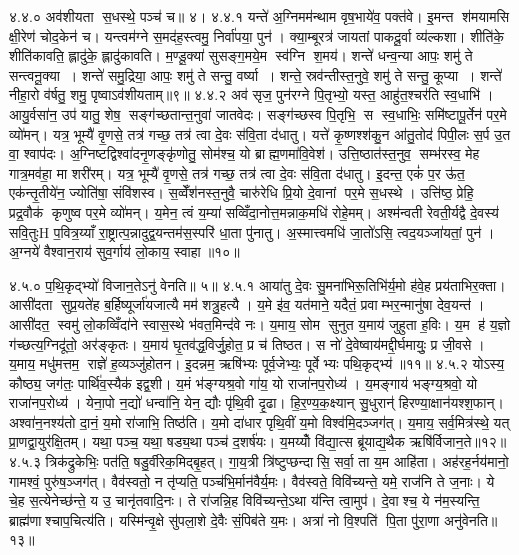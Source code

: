 ४.४.०
अव॑शीयता स॒धस्थे॒ पञ्च॑ च॥ ४।
४.४.१
यन्ते॑ अ॒ग्निमम॑न्थाम वृष॒भाये॑व॒ पक्त॑वे। इ॒मन्त श॑मयामसि क्षी॒रेण॑ चोद॒केन॑ च। यन्त्वम॑ग्ने स॒मद॑ह॒स्त्वमु॒ निर्वा॑पया॒ पुन॑। क्या॒म्बूरत्र॑ जायतां पाकदू॒र्वा व्य॑ल्कशा। शीति॑के॒ शीति॑कावति॒ ह्लादु॑के॒ ह्लादु॑कावति। म॒ण्डू॒क्या॑ सुसङ्ग॒मये॒म स्व॑ग्नि श॒मय॑। शन्ते॑ धन्व॒न्या आपः॒ शमु॑ ते सन्त्वनू॒क्या। शन्ते॑ समु॒द्रिया॒ आपः॒ शमु॑ ते सन्तु॒ वर्ष्या। शन्ते॒ स्रव॑न्तीस्त॒नुवे॒ शमु॑ ते सन्तु॒ कूप्या। शन्ते॑ नीहा॒रो व॑र्\mbox{}षतु॒ शमु॒ पृष्वाऽव॑शीयताम्॥९॥
४.४.२
अव॑ सृज॒ पुन॑रग्ने पि॒तृभ्यो॒ यस्त॒ आहु॑त॒श्चर॑ति स्व॒धाभि॑। आयु॒र्वसा॑न॒ उप॑ यातु॒ शेष॒ सङ्ग॑च्छतान्त॒नुवा॑ जातवेदः। सङ्ग॑च्छस्व पि॒तृभि॒ स स्व॒धाभिः॒ समि॑ष्टापू॒र्तेन॑ पर॒मे व्यो॑मन्। यत्र॒ भूम्यै॑ वृ॒णसे॒ तत्र॑ गच्छ॒ तत्र॑ त्वा दे॒वः स॑वि॒ता द॑धातु। यत्ते॑ कृ॒ष्णश्श॑कु॒न आ॑तु॒तोद॑ पिपी॒लः स॒र्प उ॒त वा॒ श्वाप॑दः। अ॒ग्निष्टद्विश्वा॑दनृ॒णङ्कृ॑णोतु॒ सोम॑श्च॒ यो ब्राह्म॒णमा॑वि॒वेश॑। उत्ति॒ष्ठात॑स्त॒नुव॒ सम्भ॑रस्व॒ मेह गात्र॒मव॑हा॒ मा शरी॑रम्। यत्र॒ भूम्यै॑ वृ॒णसे॒ तत्र॑ गच्छ॒ तत्र॑ त्वा दे॒वः स॑वि॒ता द॑धातु। इ॒दन्त॒ एकं॑ प॒र ऊ॑त॒ एक॑न्तृ॒तीये॑न॒ ज्योति॑षा॒ संवि॑शस्व। स॒व्वेँश॑नस्त॒नुवै॒ चारु॑रेधि प्रि॒यो दे॒वानां पर॒मे स॒धस्थे। उत्ति॑ष्ठ॒ प्रेहि॒ प्रद्र॒वौक॑ कृणुष्व पर॒मे व्यो॑मन्। य॒मेन॒ त्वं य॒म्या॑ सव्विँदा॒नोत्त॒मन्नाक॒मधि॑ रोहे॒मम्। अश्म॑न्वती रेवती॒र्यद्वै दे॒वस्य॑ सवि॒तुःH प॒वित्र॒य्याँ रा॒ष्ट्रात्प॒न्नादुद्व॒यन्तम॑स॒स्परि॑ धा॒ता पु॑नातु। अ॒स्मात्त्वमधि॑ जा॒तो॑ऽसि॒ त्वद॒यञ्जा॑यतां॒ पुन॑। अ॒ग्नये॑ वैश्वान॒राय॑ सुव॒र्गाय॑ लो॒काय॒ स्वाहा॥१०॥
\anuvakamend

४.५.०
प॒थि॒कृद्भ्यो॑ विजान॒तेऽनु॑ वेनति॥ ५॥
४.५.१
आया॑तु दे॒वः सु॒मना॑भिरू॒तिभि॑र्य॒मो ह॑वे॒ह प्रय॑ताभिर॒क्ता। आसी॑दता सुप्र॒यते॑ह ब॒र्\mbox{}हिष्यूर्जा॑यजात्यै मम॑ शत्रु॒हत्यै। य॒मे इ॑व॒ यत॑माने॒ यदैतं॒ प्रवाम्भर॒न्मानु॑षा देव॒यन्त॑। आसी॑दत॒ स्वमु॑ लो॒कव्विँदा॑ने स्वास॒स्थे भ॑वत॒मिन्द॑वे नः। य॒माय॒ सोम सुनुत य॒माय॑ जुहुता ह॒विः। य॒म ह॑ य॒ज्ञो ग॑च्छत्य॒ग्निदू॑तो॒ अर॑ङ्कृतः। य॒माय॑ घृ॒तव॑द्ध॒विर्जु॒होत॒ प्र च॑ तिष्ठत। स नो॑ दे॒वेष्वाय॑मद्दी॒र्घमायुः॒ प्र जी॒वसे। य॒माय॒ मधु॑मत्तम॒ राज्ञे॑ ह॒व्यञ्जु॑होतन। इ॒दन्नम॒ ऋषि॑भ्यः पूर्व॒जेभ्यः॒ पूर्वेभ्यः पथि॒कृद्भ्य॑॥११॥
४.५.२
योऽस्य॒ कौष्ठ्य॒ जग॑तः॒ पार्थि॑व॒स्यैक॑ इद्व॒शी। य॒मं भ॑ङ्ग्यश्र॒वो गा॑य॒ यो राजा॑नप॒रोध्य॑। य॒मङ्गाय॑ भङ्ग्य॒श्रवो॒ यो राजा॑नप॒रोध्य॑। येना॒पो न॒द्यो॑ धन्वा॑नि॒ येन॒ द्यौः पृ॑थि॒वी दृ॒ढा। हि॒र॒ण्य॒क॒क्ष्यान् सु॒धुरान्॑ हिरण्या॒क्षान॑यश्श॒फान्। अश्वा॑न॒नश्य॑तो दा॒नं॒ य॒मो रा॑जाभि॒ तिष्ठ॑ति। य॒मो दा॑धार पृथि॒वीं य॒मो विश्व॑मि॒दञ्जग॑त्। य॒माय॒ सर्व॒मित्र॑स्थे॒ यत् प्रा॒णद्वा॒युर॑क्षि॒तम्। यथा॒ पञ्च॒ यथा॒ षड्य॒था पञ्च॑ द॒शर्\mbox{}ष॑यः। य॒मय्योँ वि॑द्या॒त्स ब्रू॑याद्य॒थैक ऋषि॑र्विजान॒ते॥१२॥
४.५.३
त्रिक॑द्रुकेभिः॒ पत॑ति॒ षडु॒र्वीरेक॒मिद्बृ॒हत्। गा॒य॒त्री त्रि॑ष्टुप्छन्दासि॒ सर्वा॒ ता य॒म आहि॑ता। अह॑रह॒र्नय॑मानो॒ गामश्वं॒ पुरु॑ष॒ञ्जग॑त्। वैव॑स्वतो॒ न तृ॑प्यति॒ पञ्च॑भि॒र्मान॑वैर्य॒मः। वैव॑स्वते॒ विवि॑च्यन्ते॒ यमे॒ राज॑नि ते ज॒नाः। ये चे॒ह स॒त्येनेच्छ॑न्ते॒ य उ॒ चानृ॑तवादि॒नः। ते रा॑जन्नि॒ह विवि॑च्यन्ते॒ऽथा य॑न्ति त्वा॒मुप॑। दे॒वाश्च॒ ये न॑म॒स्यन्ति॒ ब्राह्म॑णाश्चाप॒चित्य॑ति। यस्मि॑न्वृ॒क्षे सु॑पला॒शे दे॒वैः सं॒पिब॑ते य॒मः। अत्रा॑ नो वि॒श्पति॑ पि॒ता पु॑रा॒णा अनु॑वेनति॥१३॥
\anuvakamend

